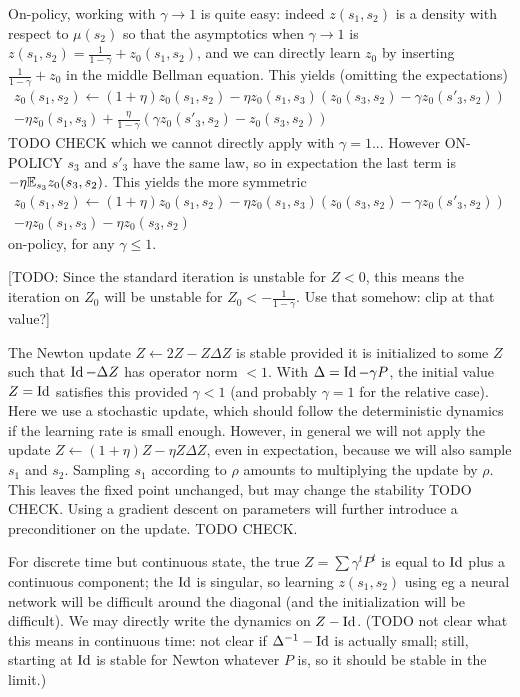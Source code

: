 \documentclass[11pt,a4paper]{article}
\begin{document}
On-policy, working with $\gamma\to 1$ is quite easy: indeed $z(s_1,s_2)$ is
a density with respect to $\mu(s_2)$ so that the asymptotics when
$\gamma\to 1$ is $z(s_1,s_2)=\frac{1}{1-\gamma}+z_0(s_1,s_2)$, and we can
directly learn $z_0$ by inserting $\frac{1}{1-\gamma}+z_0$ in the middle
Bellman equation. This yields (omitting the expectations)
\begin{multline}
z_0(s_1,s_2)\gets (1+\eta)z_0(s_1,s_2)-\eta
z_0(s_1,s_3)(z_0(s_3,s_2)-\gamma z_0(s'_3,s_2))\\-\eta
z_0(s_1,s_3)+\frac{\eta}{1-\gamma}(\gamma z_0(s'_3,s_2)-z_0(s_3,s_2))
\end{multline}
TODO CHECK which we cannot directly apply with $\gamma=1$...
However ON-POLICY $s_3$ and
$s'_3$ have the same law, so in expectation the last term is $-\eta
\mathbb{E}_{s_3} z_0(s_3,s_2)$. This yields the more symmetric
\begin{multline}
z_0(s_1,s_2)\gets (1+\eta)z_0(s_1,s_2)-\eta
z_0(s_1,s_3)\left(z_0(s_3,s_2)-\gamma z_0(s'_3,s_2)\right)\\-\eta
z_0(s_1,s_3)-\eta z_0(s_3,s_2)
\end{multline}
on-policy, for any $\gamma\leq 1$.

[TODO: Since the standard iteration is unstable for $Z<0$, this means the
iteration on $Z_0$ will be unstable for $Z_0<-\frac{1}{1-\gamma}$.
Use that somehow: clip at that value?]

The Newton update $Z\gets 2Z-Z\Delta Z$ is stable provided it is
initialized to some $Z$ such that $\operatorname{Id}-\Delta Z$
has operator norm $< 1$. With $\Delta=\operatorname{Id}-\gamma P$, the initial value
$Z=\operatorname{Id}$ satisfies this provided $\gamma<1$ (and probably $\gamma=1$ for
the relative case). Here we use a stochastic update, which should follow
the deterministic dynamics if the learning rate is small enough. However,
in general we will not apply the update $Z\gets (1+\eta)Z-\eta Z\Delta
Z$, even in expectation, because we will also sample $s_1$ and $s_2$.
Sampling $s_1$ according to $\rho$ amounts to multiplying the update by
$\rho$. This leaves the fixed point unchanged, but may change the
stability TODO CHECK. Using a gradient descent on parameters will further
introduce a preconditioner on the update. TODO CHECK.

For discrete time but continuous state, the true $Z=\sum \gamma^t P^t$ is
equal to $\operatorname{Id}$ plus a continuous component; the $\operatorname{Id}$ is singular, so
learning $z(s_1,s_2)$ using eg a neural network will be difficult around
the diagonal (and the initialization will be difficult). We may directly
write the dynamics on $Z-\operatorname{Id}$. (TODO not clear what this means in
continuous time: not clear if $\Delta^{-1}-\operatorname{Id}$ is actually small; still,
starting at $\operatorname{Id}$ is stable for Newton whatever $P$ is, so it should be
stable in the limit.)
\end{document}
